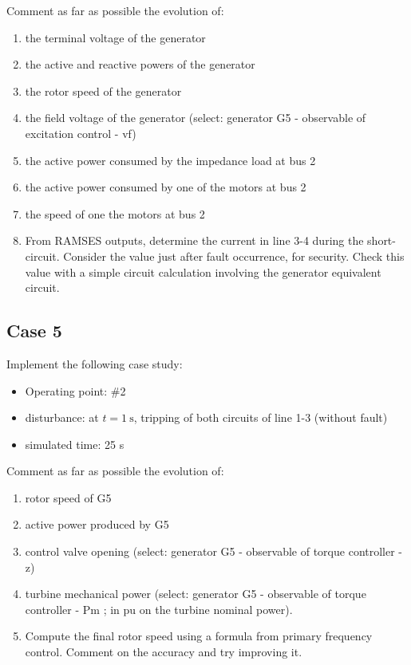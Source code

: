 \documentclass[a4paper,11pt,oneside,onecolumn]{article}
\begin{document}
\noindent Comment as far as possible the evolution of:
\begin{enumerate}
\item the terminal voltage of the generator
\item the active and reactive powers of the generator
\item the rotor speed of the generator
\item the field voltage of the generator (select: generator G5 - observable of excitation control - vf)
\item the active power consumed by the impedance load at bus 2
\item the active power consumed by one of the motors at bus 2
\item the speed of one the motors at bus 2
\item From RAMSES outputs, determine the current in line 3-4 during the short-circuit. Consider the value just after fault occurrence, for security. Check this value with a simple circuit calculation involving the generator equivalent circuit.
\end{enumerate}

\subsection{Case 5}

Implement the following case study:
\begin{itemize}
\item Operating point: \#2
\item disturbance: at $t=1 \mathrm{~s}$, tripping of both circuits of line 1-3 (without fault)
\item simulated time: 25 s
\end{itemize}

\noindent Comment as far as possible the evolution of:
\begin{enumerate}
\item rotor speed of G5
\item active power produced by G5
\item control valve opening (select: generator G5 - observable of torque controller - z)
\item turbine mechanical power (select: generator G5 - observable of torque controller - Pm ; in pu on the turbine nominal power).	
\item Compute the final rotor speed using a formula from primary frequency control. Comment on the accuracy and try improving it.
\end{enumerate}
\end{document}
